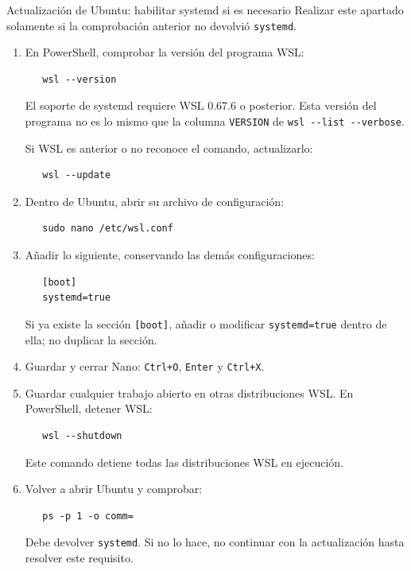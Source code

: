 \documentclass[presentation]{beamer}
\begin{document}
\begin{frame}{Actualización de Ubuntu: habilitar systemd si es necesario}
 Realizar este apartado solamente si la comprobación anterior no
devolvió \texttt{systemd}.

\begin{enumerate}
\item En PowerShell, comprobar la versión del programa WSL:

\begin{verbatim}
   wsl --version
\end{verbatim}

El soporte de systemd requiere WSL 0.67.6 o posterior.
Esta versión del programa no es lo mismo que la columna
\texttt{VERSION} de \texttt{wsl -{}-{}list -{}-{}verbose}.

Si WSL es anterior o no reconoce el comando, actualizarlo:

\begin{verbatim}
   wsl --update
\end{verbatim}

\item Dentro de Ubuntu, abrir su archivo de configuración:

\begin{verbatim}
   sudo nano /etc/wsl.conf
\end{verbatim}

\item Añadir lo siguiente, conservando las demás configuraciones:

\begin{verbatim}
   [boot]
   systemd=true
\end{verbatim}

Si ya existe la sección \texttt{[boot]}, añadir o modificar
\texttt{systemd=true} dentro de ella; no duplicar la sección.

\item Guardar y cerrar Nano: \texttt{Ctrl+O}, \texttt{Enter} y \texttt{Ctrl+X}.

\item Guardar cualquier trabajo abierto en otras distribuciones WSL.
En PowerShell, detener WSL:

\begin{verbatim}
   wsl --shutdown
\end{verbatim}

Este comando detiene todas las distribuciones WSL en ejecución.

\item Volver a abrir Ubuntu y comprobar:

\begin{verbatim}
   ps -p 1 -o comm=
\end{verbatim}

Debe devolver \texttt{systemd}. Si no lo hace, no continuar con la
actualización hasta resolver este requisito.
\end{enumerate}
\end{frame}
\end{document}
